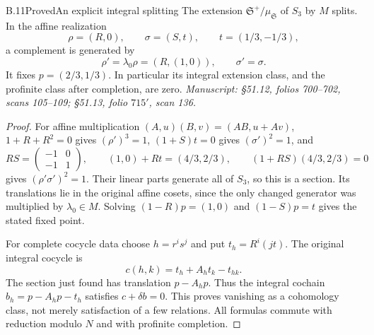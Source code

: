 \begin{statement}{B.11}{Proved}{An explicit integral splitting}
The extension \(\mathfrak S^+/\mu_{\mathfrak S}\) of \(S_3\) by \(M\)
splits. In the affine realization
\[
 \rho=(R,0),\qquad \sigma=(S,t),\qquad
 t=(1/3,-1/3),
\]
a complement is generated by
\[
 \rho'=\lambda_0\rho=(R,(1,0)),\qquad \sigma'=\sigma.
\]
It fixes \(p=(2/3,1/3)\). In particular its integral extension
class, and the profinite class after completion, are zero.
\emph{Manuscript: \S51.12, folios 700--702, scans 105--109;
\S51.13, folio \(715'\), scan 136.}
\end{statement}
\begin{proof}
For affine multiplication \((A,u)(B,v)=(AB,u+Av)\),
\(1+R+R^2=0\) gives \((\rho')^3=1\),
\((1+S)t=0\) gives \((\sigma')^2=1\), and
\[
 RS=\begin{pmatrix}-1&0\\-1&1\end{pmatrix},\qquad
 (1,0)+Rt=(4/3,2/3),\qquad
 (1+RS)(4/3,2/3)=0
\]
gives \((\rho'\sigma')^2=1\). Their linear parts generate all of
\(S_3\), so this is a section. Its translations lie in the original
affine cosets, since the only changed generator was multiplied by
\(\lambda_0\in M\). Solving \((1-R)p=(1,0)\) and
\((1-S)p=t\) gives the stated fixed point.

For complete cocycle data choose \(h=r^i s^j\) and put
\(t_h=R^i(jt)\). The original integral cocycle is
\[
 c(h,k)=t_h+A_h t_k-t_{hk}.
\]
The section just found has translation \(p-A_hp\).
Thus the integral cochain \(b_h=p-A_hp-t_h\) satisfies
\(c+\delta b=0\). This proves vanishing as a cohomology class,
not merely satisfaction of a few relations. All formulas commute
with reduction modulo \(N\) and with profinite completion.
\end{proof}

